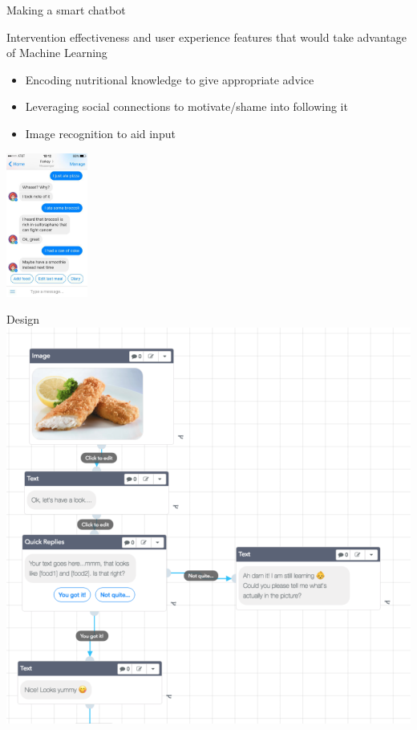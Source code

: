 \documentclass[landscape]{infslides}
\begin{document}
\begin{slide}{Making a smart chatbot}
    \begin{multicols}{2}
        Intervention effectiveness and user experience features that would take advantage of Machine Learning
        \begin{itemize} 
            \item Encoding nutritional knowledge to give appropriate advice
            \item Leveraging social connections to motivate/shame into following it
            \item Image recognition to aid input
        \end{itemize} 
        \includegraphics[width=0.2\textwidth, right]{Forksy.jpg}
    \end{multicols}
\end{slide}
\begin{slide}{Design}
    \centering
    \includegraphics[height=0.85\textheight]{Botmock.png}
\end{slide}
\end{document}
